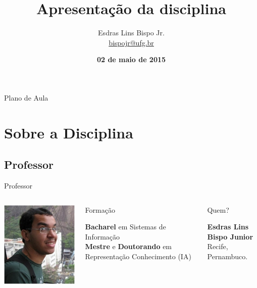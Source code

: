 \documentclass[xcolor=dvipsnames,table]{beamer}
\title{Apresentação da disciplina}
\author{
  Esdras Lins Bispo Jr. \\ \url{bispojr@ufg.br}
  }
\institute{
  Teoria de Grafos \\Bacharelado em Ciência da Computação}
\date{\textbf{02 de maio de 2015} }
\begin{document}
	\begin{frame}
		\titlepage
	\end{frame}

	\AtBeginSection{
		\begin{frame}{Sumário}%
    		\tableofcontents[currentsection]
		\end{frame}
	}

	\begin{frame}{Plano de Aula}
		\tableofcontents
	\end{frame}
	
	\section{Sobre a Disciplina}
	\subsection{Professor}
	\begin{frame}{Professor}
		\begin{columns}
		  		\begin{center}
		    		\includegraphics[height=.5\textheight]{images/esdras.png}
		  		\end{center}
				\begin{block}{Formação}
					\begin{center}
						{\normalsize {\bf Bacharel} em Sistemas de Informação\\
						{\bf Mestre} e {\bf Doutorando} em Representação Conhecimento (IA)}
					\end{center}
				\end{block}		  		
		  		\begin{block}{Quem?}
		  			\begin{center}
						{\bf Esdras Lins Bispo Junior} \\ Recife, Pernambuco.
					\end{center}
				\end{block}
		\end{columns}
	\end{frame}
	
\end{document}
